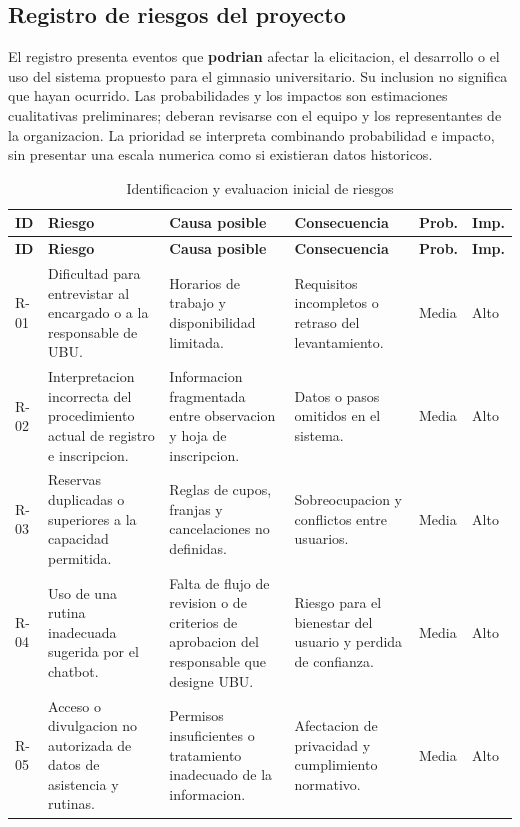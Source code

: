 \subsection{Registro de riesgos del proyecto}
\label{sec:riesgos}

El registro presenta eventos que \textbf{podrian} afectar la elicitacion, el desarrollo o el uso del sistema propuesto para el gimnasio universitario. Su inclusion no significa que hayan ocurrido. Las probabilidades y los impactos son estimaciones cualitativas preliminares; deberan revisarse con el equipo y los representantes de la organizacion. La prioridad se interpreta combinando probabilidad e impacto, sin presentar una escala numerica como si existieran datos historicos.

\begingroup
\footnotesize
\renewcommand{\arraystretch}{1.16}
\begin{longtable}{|p{0.8cm}|p{3.7cm}|p{3.4cm}|p{3.2cm}|p{1.0cm}|p{1.0cm}|}
\caption{Identificacion y evaluacion inicial de riesgos}\label{tab:identificacion-riesgos}\\\hline
\textbf{ID} & \textbf{Riesgo} & \textbf{Causa posible} & \textbf{Consecuencia} & \textbf{Prob.} & \textbf{Imp.} \\ \hline
\endfirsthead
\hline \textbf{ID} & \textbf{Riesgo} & \textbf{Causa posible} & \textbf{Consecuencia} & \textbf{Prob.} & \textbf{Imp.} \\ \hline
\endhead
R-01 & Dificultad para entrevistar al encargado o a la responsable de UBU. & Horarios de trabajo y disponibilidad limitada. & Requisitos incompletos o retraso del levantamiento. & Media & Alto \\ \hline
R-02 & Interpretacion incorrecta del procedimiento actual de registro e inscripcion. & Informacion fragmentada entre observacion y hoja de inscripcion. & Datos o pasos omitidos en el sistema. & Media & Alto \\ \hline
R-03 & Reservas duplicadas o superiores a la capacidad permitida. & Reglas de cupos, franjas y cancelaciones no definidas. & Sobreocupacion y conflictos entre usuarios. & Media & Alto \\ \hline
R-04 & Uso de una rutina inadecuada sugerida por el chatbot. & Falta de flujo de revision o de criterios de aprobacion del responsable que designe UBU. & Riesgo para el bienestar del usuario y perdida de confianza. & Media & Alto \\ \hline
R-05 & Acceso o divulgacion no autorizada de datos de asistencia y rutinas. & Permisos insuficientes o tratamiento inadecuado de la informacion. & Afectacion de privacidad y cumplimiento normativo. & Media & Alto \\ \hline

\end{longtable}
